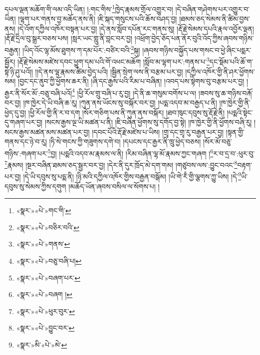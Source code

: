 དཔལ་ལྡན་མཆོག་གི་ལམ་འདི་ཡིན། །:གང་གིས་\footnote{«སྣར་»«པེ་»གང་གི་}ཁྱེད་རྣམས་གྲོལ་འགྱུར་བ། །དེ་བཞིན་གཤེགས་པར་འགྱུར་བ་ཡིན། །ལྷག་པར་གནས་བྱ་མཆོད་ནས་ནི། །ཇི་སྐད་གསུངས་པའི་ཆོས་བཤད་བྱ། །ཐམས་ཅད་སེམས་ནི་ཚིམ་བྱས་ནས། །དེ་འོག་དཀྱིལ་འཁོར་བསྟན་པར་བྱ། །དེ་ནས་སློབ་དཔོན་རང་གནས་སུ། །རྡོ་རྗེ་སེམས་དཔའི་རྣལ་འབྱོར་ལྡན། །རྡོ་རྗེ་དྲིལ་བུ་སྒྲར་བཅས་པས། །སླར་ཡང་གླུ་ནི་བླང་བར་བྱ། །འཕྲོག་བྱེད་ཅོད་པན་ནོར་བུའི་འོད་ཀྱིས་ཞབས་གཉིས་བརྒྱན། །ཡིད་འོང་ལྷ་མོས་ཐུགས་ཀ་དམ་པོར་:བཙིར་བའི་\footnote{«སྣར་»«པེ་»བཅིར་བའི་}སྐུ། །ཞབས་གཉིས་བསྐྱོད་པས་གསང་བ་ཕྱེ་ཞིང་པདྨར་སྦྱོར། །རྡོ་རྗེ་སེམས་མཛེས་དབང་ཕྱུག་དམ་པའི་གོ་འཕང་མཆོག །སློབ་མ་ལྷག་པར་:གནས་པ་\footnote{«སྣར་»«པེ་»གནས་}དང་སྡོམ་པའི་ཆོ་ག་སྟེ་ཉི་ཤུ་པའོ།། །།དེ་ནས་ལྷ་རྣམས་ཚིམ་བྱེད་པའི། །སྦྱིན་སྲེག་ལས་ནི་བརྩམ་པར་བྱ། །དཀྱིལ་འཁོར་གྱི་ནི་ཤར་ཕྱོགས་སམ། །བྱང་དང་ནུབ་ཀྱི་ཕྱོགས་ཆར་ནི། །ཞི་དང་རྒྱས་པའི་རིམ་པ་བཞིན། །འབད་པས་སྟེགས་བུ་བརྩམ་པར་བྱ། །རྒྱར་ནི་སོར་མོ་:བཅུ་བཞི་པའོ།\footnote{«སྣར་»«པེ་»བཅུ་བཞི་པ།} །ཕྱི་རོལ་གྲུ་བཞི་པ་རུ་བྱ། །དེ་ནི་ཆ་གསུམ་བགོས་པ་ལ། །ཟབས་སུ་ཆ་གཉིས་བརྐོ་བར་བྱ། །ཁ་ཁྱེར་དེ་ཡི་བཞི་ཆ་རུ། །ཀུན་ནས་ཡོངས་སུ་བསྐོར་བར་བྱ། །པདྨ་འདབ་མ་བརྒྱད་པ་ནི། །ཁ་ཁྱེར་གྱི་ནི་ཕྱེད་དུ་བྱ། །ཕྱི་རོལ་གྱི་ནི་ར་བ་དག །སོར་གཅིག་པས་ནི་ཀུན་ནས་བསྐོར། །ཐབ་ཁུང་དབུས་སུ་རྡོ་རྗེ་ནི། །པདྨའི་སྟེང་དུ་གཞག་པར་བྱ། །སངས་རྒྱས་ལྔ་ཡི་མཚན་པ་ནི། །ཇི་བཞིན་ཕྱོགས་སུ་དགོད་བྱ་སྟེ། །ཁ་ཁྱེར་གྱི་ནི་ཕྱོགས་བཞི་རུ། །སངས་རྒྱས་མཚན་མས་མཚན་པར་བྱ། །དབང་པོའི་རྡོ་རྗེ་མཛེས་པ་ཡིས། །གྲྭ་དང་གྲྭ་རུ་བརྒྱན་པར་བྱ། །སྟན་གྱི་གནས་དང་ཉེ་བ་རུ། །ཏི་སེ་གངས་ཀྱི་གཟུགས་དགེ་བ། །དཔངས་དང་རྒྱར་ནི་ཁྲུ་ཕྱེད་བཅས། །སོར་མོ་བཅུ་གཉིས་:གཞག་པར་\footnote{«སྣར་»«པེ་»བཞག་པར་}བྱ། །པདྨའི་འདབ་མ་རྣམས་ལ་ནི། །རིམ་བཞིན་ལྷ་མོ་རྣམས་ཀྱང་གཞག །\footnote{«སྣར་»«པེ་»བཞག །}ར་བ་དྲ་བ་:ཕུར་བུ་\footnote{«སྣར་»«པེ་»ཕུར་བུར་}རྣམས། །སྔར་བཞིན་ཐམས་ཅད་སྦྱར་བར་བྱ། །དེར་ནི་དུར་ཁྲོད་མེ་དག་གམ། །གཙུབས་ལས་:བྱུང་བའང་\footnote{«སྣར་»«པེ་»བྱུང་བར་}བརྟག་པར་བྱ། །དེ་ཡི་དབུས་སུ་པདྨ་ནི། །ཉི་མའི་དཀྱིལ་འཁོར་གྱིས་བརྒྱན་བསྒོམ། །ཡི་གེ་རྃ་གྱི་ལྕགས་ཀྱུ་ཡིས། །དེ་\footnote{«སྣར་»མི་«པེ་»མེ་}ཡི་དབུས་སུ་སེམས་ཀྱིས་དགུག །མཆོད་ཡོན་ཞབས་བསིལ་ལ་སོགས་པ། །
